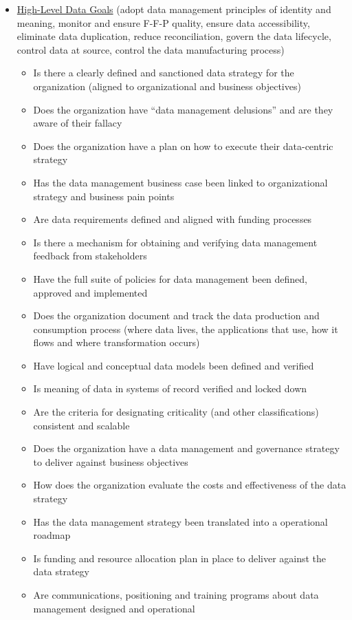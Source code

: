 \begin{itemize}
  \item \ul{High-Level Data Goals} (adopt data management principles of identity and meaning, monitor and ensure F-F-P quality, ensure data accessibility, eliminate data duplication, reduce reconciliation, govern the data lifecycle, control data at source, control the data manufacturing process)

    \begin{itemize}
      \item Is there a clearly defined and sanctioned data strategy for the organization (aligned to organizational and business objectives)
      \item Does the organization have “data management delusions” and are they aware of their fallacy
      \item Does the organization have a plan on how to execute their data-centric strategy
      \item Has the data management business case been linked to organizational strategy and business pain points
      \item Are data requirements defined and aligned with funding processes
      \item Is there a mechanism for obtaining and verifying data management feedback from stakeholders
      \item Have the full suite of policies for data management been defined, approved and implemented
      \item Does the organization document and track the data production and consumption process (where data lives, the applications that use, how it flows and where transformation occurs)
      \item Have logical and conceptual data models been defined and verified
      \item Is meaning of data in systems of record verified and locked down
      \item Are the criteria for designating criticality (and other classifications) consistent and scalable
      \item Does the organization have a data management and governance strategy to deliver against business objectives
      \item How does the organization evaluate the costs and effectiveness of the data strategy
      \item Has the data management strategy been translated into a operational roadmap
      \item Is funding and resource allocation plan in place to deliver against the data strategy
      \item Are communications, positioning and training programs about data management designed and operational
    \end{itemize}
\end{itemize}










